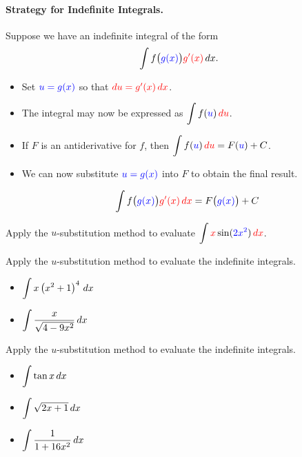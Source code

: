 \documentclass[12pt]{article}
\begin{document}
\paragraph{Strategy for Indefinite Integrals.} Suppose we have an indefinite integral of the form 
$$\displaystyle\int f\big(\textcolor{blue}{g(x)}\big) \textcolor{red}{g'(x)}\,dx.$$
\begin{itemize}
\item[\tc{1}] Set $\textcolor{blue}{u=g(x)}$ so that $\textcolor{red}{du=g'(x)\,dx}$.
\item[\tc{2}] The integral may now be expressed as $\displaystyle\int f(\textcolor{blue}{u})\,\textcolor{red}{du}$.
\item[\tc{3}] If $F$ is an antiderivative for $f$, then $\displaystyle\int f(\textcolor{blue}{u})\,\textcolor{red}{du}=F(\textcolor{blue}{u})+C$.
\item[\tc{4}] We can now substitute $\textcolor{blue}{u=g(x)}$ into $F$ to obtain the final result.

$$\int f\big( \textcolor{blue}{g(x)}\big) \textcolor{red}{g'(x)\,dx}=F\big(\textcolor{blue}{g(x)}\big) + C$$
\end{itemize}

\newpage

\Example Apply the $u$-substitution method to evaluate $\displaystyle\int \textcolor{red}{x}\sin(\textcolor{blue}{2x^2})\,\textcolor{red}{dx}$.

\vspace{50mm}

\Example Apply the $u$-substitution method to evaluate the indefinite integrals.
\begin{itemize}
	\item[\tc{1}] $\displaystyle\int x\left( x^2+1\right)^4\,dx$
	
	\vspace{55mm}
	
	\item[\tc{2}] $\displaystyle\int\frac{x}{\sqrt{4-9x^2}}\,dx$
	
\end{itemize}

\newpage
\ExampleCont Apply the $u$-substitution method to evaluate the indefinite integrals.
\begin{itemize}
	\item[\tc{3}] $\displaystyle\int\tan x\,dx$
	
	\vspace{55mm}
	
	\item[\tc{4}] $\displaystyle\int\sqrt{2x+1}\,dx$
	
	\vspace{55mm}
	
	\item[\tc{5}] $\displaystyle\int \frac{1}{1+16x^2}\,dx$
\end{itemize}
\end{document}
